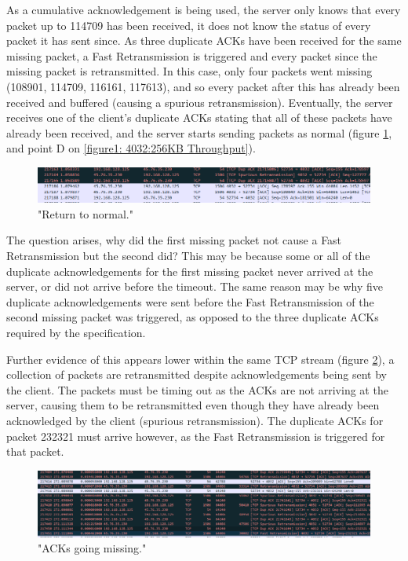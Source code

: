 \documentclass[12pt]{article}
\begin{document}
As a cumulative acknowledgement is being used, the server only knows that every packet up to 114709 has been received, it does not know the status of every packet it has sent since.
As three duplicate ACKs have been received for the same missing packet, a Fast Retransmission is triggered and every packet since the missing packet is retransmitted.
In this case, only four packets went missing (108901, 114709, 116161, 117613), and so every packet after this has already been received and buffered (causing a spurious retransmission).
Eventually, the server receives one of the client's duplicate ACKs stating that all of these packets have already been received, and the server starts sending packets as normal (figure \ref{figure6: Return to normal}, and point D on \ref{figure1: 4032:256KB Throughput}).

\begin{figure}[!htbp]
  \centering
  \includegraphics[width=\linewidth]{4032-256KB-back-to-normal.PNG}
  \caption{"Return to normal."}
  \label{figure6: Return to normal}
\end{figure}

The question arises, why did the first missing packet not cause a Fast Retransmission but the second did?
This may be because some or all of the duplicate acknowledgements for the first missing packet never arrived at the server, or did not arrive before the timeout.
The same reason may be why five duplicate acknowledgements were sent before the Fast Retransmission of the second missing packet was triggered, as opposed to the three duplicate ACKs required by the specification. 

Further evidence of this appears lower within the same TCP stream (figure \ref{figure7: Missing ACKs}), a collection of packets are retransmitted despite acknowledgements being sent by the client.
The packets must be timing out as the ACKs are not arriving at the server, causing them to be retransmitted even though they have already been acknowledged by the client (spurious retransmission).
The duplicate ACKs for packet 232321 must arrive however, as the Fast Retransmission is triggered for that packet.

\begin{figure}[!htbp]
  \centering
  \includegraphics[width=\linewidth]{4032-256KB-lost-acks.PNG}
  \caption{"ACKs going missing."}
  \label{figure7: Missing ACKs}
\end{figure}
\end{document}
